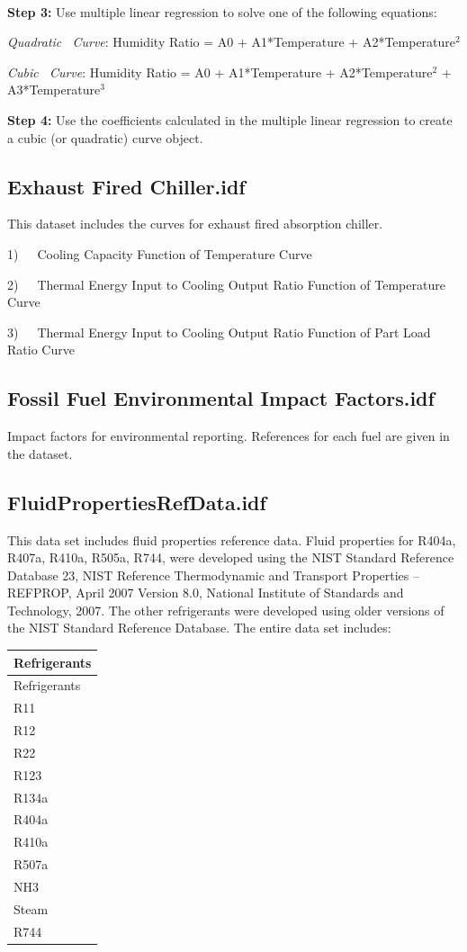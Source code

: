 \textbf{~}

\textbf{Step 3:} Use multiple linear regression to solve one of the following equations:

\emph{Quadratic~ Curve}: Humidity Ratio = A0 + A1*Temperature + A2*Temperature\(^{2}\)

\emph{Cubic~ Curve}: Humidity Ratio = A0 + A1*Temperature + A2*Temperature\(^{2}\) + A3*Temperature\(^{3}\)

\textbf{Step 4:} Use the coefficients calculated in the multiple linear regression to create a cubic (or quadratic) curve object.

\subsection{Exhaust Fired Chiller.idf}\label{exhaust-fired-chiller.idf}

This dataset includes the curves for exhaust fired absorption chiller.

1)~~~Cooling Capacity Function of Temperature Curve

2)~~~Thermal Energy Input to Cooling Output Ratio Function of Temperature Curve

3)~~~Thermal Energy Input to Cooling Output Ratio Function of Part Load Ratio Curve

\subsection{Fossil Fuel Environmental Impact Factors.idf}\label{fossil-fuel-environmental-impact-factors.idf}

Impact factors for environmental reporting. References for each fuel are given in the dataset.

\subsection{FluidPropertiesRefData.idf}\label{fluidpropertiesrefdata.idf}

This data set includes fluid properties reference data. Fluid properties for R404a, R407a, R410a, R505a, R744, were developed using the NIST Standard Reference Database 23, NIST Reference Thermodynamic and Transport Properties -- REFPROP, April 2007 Version 8.0, National Institute of Standards and Technology, 2007. The other refrigerants were developed using older versions of the NIST Standard Reference Database. The entire data set includes:

\begin{longtable}[c]{@{}l@{}}
\toprule 
Refrigerants \tabularnewline
\midrule
\endfirsthead

\toprule 
Refrigerants \tabularnewline
\midrule
\endhead

R11 \tabularnewline
R12 \tabularnewline
R22 \tabularnewline
R123 \tabularnewline
R134a \tabularnewline
R404a \tabularnewline
R410a \tabularnewline
R507a \tabularnewline
NH3 \tabularnewline
Steam \tabularnewline
R744 \tabularnewline
\bottomrule
\end{longtable}

